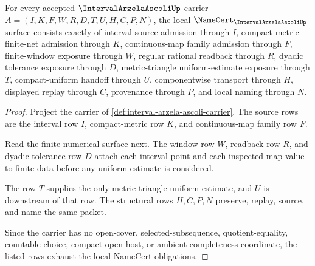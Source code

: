 \begin{theorem}
\label{thm:interval-arzela-ascoli-namecert-obligations}
For every accepted $\IntervalArzelaAscoliUp$ carrier $A=(I,K,F,W,R,D,T,U,H,C,P,N)$, the local $\NameCert_{\IntervalArzelaAscoliUp}$ surface consists exactly of interval-source admission through $I$, compact-metric finite-net admission through $K$, continuous-map family admission through $F$, finite-window exposure through $W$, regular rational readback through $R$, dyadic tolerance exposure through $D$, metric-triangle uniform-estimate exposure through $T$, compact-uniform handoff through $U$, componentwise transport through $H$, displayed replay through $C$, provenance through $P$, and local naming through $N$.
\end{theorem}
\begin{proof}
Project the carrier of \autoref{def:interval-arzela-ascoli-carrier}. The source rows are the interval row $I$, compact-metric row $K$, and continuous-map family row $F$.

Read the finite numerical surface next. The window row $W$, readback row $R$, and dyadic tolerance row $D$ attach each interval point and each inspected map value to finite data before any uniform estimate is considered.

The row $T$ supplies the only metric-triangle uniform estimate, and $U$ is downstream of that row. The structural rows $H,C,P,N$ preserve, replay, source, and name the same packet.

Since the carrier has no open-cover, selected-subsequence, quotient-equality, countable-choice, compact-open host, or ambient completeness coordinate, the listed rows exhaust the local NameCert obligations.
\end{proof}

